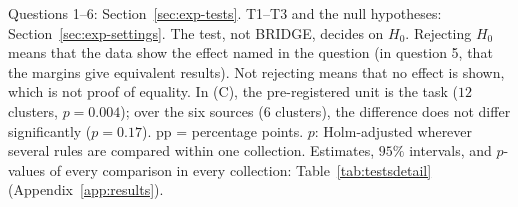\begin{table}[!t]
\vspace{2pt}
\parbox{\textwidth}{\justifying\scriptsize Questions 1--6: Section~\ref{sec:exp-tests}. T1--T3 and the null hypotheses: Section~\ref{sec:exp-settings}. The test, not BRIDGE, decides on $H_0$. Rejecting $H_0$ means that the data show the effect named in the question (in question 5, that the margins give equivalent results). Not rejecting means that no effect is shown, which is not proof of equality. In (C), the pre-registered unit is the task ($12$ clusters, $p=0.004$); over the six sources ($6$ clusters), the difference does not differ significantly ($p=0.17$). pp = percentage points. $p$: Holm-adjusted wherever several rules are compared within one collection. Estimates, $95\%$ intervals, and $p$-values of every comparison in every collection: Table~\ref{tab:testsdetail} (Appendix~\ref{app:results}).}
\end{table}

